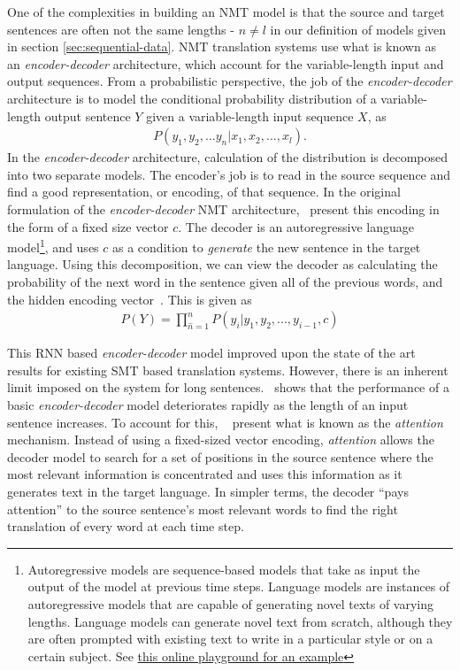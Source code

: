 \newcommand{\ed}{\emph{encoder-decoder}}
One of the complexities in building an NMT model is that the source and target sentences are often not the same lengths - $n \neq l$ in our definition of \seq{} models given in section \ref{sec:sequential-data}. NMT translation systems use what is known as an \ed{} architecture, which account for the variable-length input and output sequences. From a probabilistic perspective, the job of the \ed{} architecture is to model the conditional probability distribution of a variable-length output sentence $Y$ given a variable-length input sequence $X$, as
\begin{align*}
P(y_1, y_2, ... y_n | x_1, x_2, ..., x_l). 
\end{align*}
In the \ed{} architecture, calculation of the distribution is decomposed into two separate models. The encoder's job is to read in the source sequence and find a good representation, or encoding, of that sequence. In the original formulation of the \ed{} NMT architecture,~\citet{cho2014learning} present this encoding in the form of a fixed size vector $c$. The decoder is an autoregressive language model\footnote{Autoregressive models are sequence-based models that take as input the output of the model at previous time steps. Language models are instances of autoregressive models that are capable of generating novel texts of varying lengths. Language models can generate novel text from scratch, although they are often prompted with existing text to write in a particular style or on a certain subject. See \href{https://transformer.huggingface.co/doc/distil-gpt2}{this online playground for an example}}, and uses $c$ as a condition to \emph{generate} the new sentence in the target language. Using this decomposition, we can view the decoder as calculating the probability of the next word in the sentence given all of the previous words, and the hidden encoding vector~\cite{bahdanau2014neural}. This is given as
\begin{align*}
P(Y) = \prod_{\hat{n}=1}^{n}P(y_i \vert y_1, y_2, ..., y_{i-1}, c)    
\end{align*}


\newcommand{\at}[1]{\emph{#1}}

This RNN based \ed{} model improved upon the state of the art results for existing SMT based translation systems. However, there is an inherent limit imposed on the system for long sentences.~\citet{cho2014learning} shows that the performance of a basic \ed{} model deteriorates rapidly as the length of an input sentence increases. To account for this, 
~\citet{bahdanau2014neural} present what is known as the \at{attention} mechanism. Instead of using a fixed-sized vector encoding, \at{attention} allows the decoder model to search for a set of positions in the source sentence where the most relevant information is concentrated and uses this information as it generates text in the target language. In simpler terms, the decoder ``pays attention'' to the source sentence's most relevant words to find the right translation of every word at each time step. 

